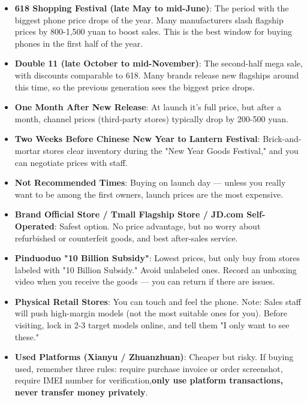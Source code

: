 \begin{itemize}
  \item \textbf{618 Shopping Festival (late May to mid-June)}: The period with the biggest phone price drops of the year. Many manufacturers slash flagship prices by 800-1,500 yuan to boost sales. This is the best window for buying phones in the first half of the year.
  \item \textbf{Double 11 (late October to mid-November)}: The second-half mega sale, with discounts comparable to 618. Many brands release new flagships around this time, so the previous generation sees the biggest price drops.
  \item \textbf{One Month After New Release}: At launch it's full price, but after a month, channel prices (third-party stores) typically drop by 200-500 yuan.
  \item \textbf{Two Weeks Before Chinese New Year to Lantern Festival}: Brick-and-mortar stores clear inventory during the "New Year Goods Festival," and you can negotiate prices with staff.
  \item \textbf{Not Recommended Times}: Buying on launch day — unless you really want to be among the first owners, launch prices are the most expensive.
\end{itemize}


\begin{itemize}
  \item \textbf{Brand Official Store / Tmall Flagship Store / JD.com Self-Operated}: Safest option. No price advantage, but no worry about refurbished or counterfeit goods, and best after-sales service.
  \item \textbf{Pinduoduo "10 Billion Subsidy"}: Lowest prices, but only buy from stores labeled with "10 Billion Subsidy." Avoid unlabeled ones. Record an unboxing video when you receive the goods — you can return if there are issues.
  \item \textbf{Physical Retail Stores}: You can touch and feel the phone. Note: Sales staff will push high-margin models (not the most suitable ones for you). Before visiting, lock in 2-3 target models online, and tell them "I only want to see these."
  \item \textbf{Used Platforms (Xianyu / Zhuanzhuan)}: Cheaper but risky. If buying used, remember three rules: require purchase invoice or order screenshot, require IMEI number for verification,\textbf{only use platform transactions, never transfer money privately}.
\end{itemize}

